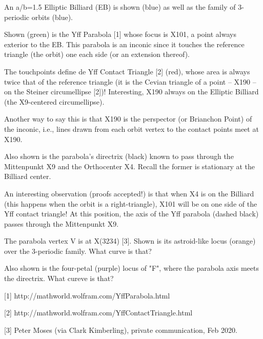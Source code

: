 An a/b=1.5 Elliptic Billiard (EB) is shown (blue) as well as the family of 3-periodic orbits (blue).

Shown (green) is the Yff Parabola [1] whose focus is X101, a point always exterior to the EB. This parabola is an inconic since it touches the reference triangle (the orbit) one each side (or an extension thereof).

The touchpoints define de Yff Contact Triangle [2] (red), whose area is always twice that of the reference triangle (it is the Cevian triangle of a point -- X190 -- on the Steiner circumellipse [2])! Interesting, X190 always on the Elliptic Billiard (the X9-centered circumellipse).

Another way to say this is that X190 is the perspector (or Brianchon Point) of the inconic, i.e., lines drawn from each orbit vertex to the contact points meet at X190. 

Also shown is the parabola's directrix (black) known to pass through the Mittenpunkt X9 and the Orthocenter X4. Recall the former is stationary at the Billiard center.

An interesting observation (proofs accepted!) is that when X4 is on the Billiard (this happens when the orbit is a right-triangle), X101 will be on one side of the Yff contact triangle! At this position, the axis of the Yff parabola (dashed black) passes through the Mittenpunkt X9.

The parabola vertex V is at X(3234) [3]. Shown is its astroid-like locus (orange) over the 3-periodic family. What curve is that?

Also shown is the four-petal (purple) locus of "F", where the parabola axis meets the directrix. What cureve is that?

[1] http://mathworld.wolfram.com/YffParabola.html

[2] http://mathworld.wolfram.com/YffContactTriangle.html

[3] Peter Moses (via Clark Kimberling), private communication, Feb 2020.